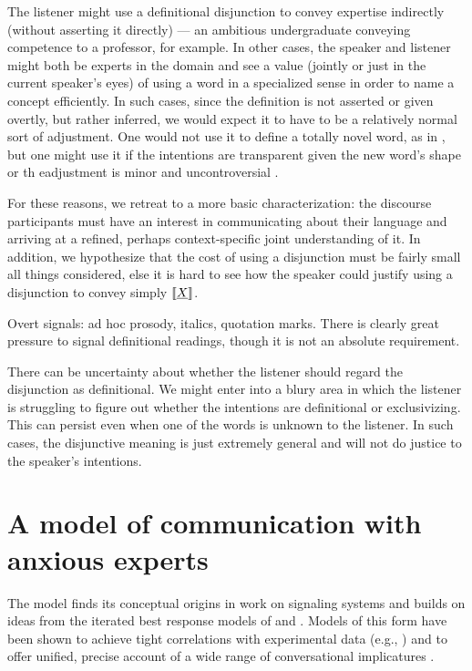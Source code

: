 \documentclass{article}
\begin{document}
The listener might use a definitional disjunction to convey expertise
indirectly (without asserting it directly) --- an ambitious
undergraduate conveying competence to a professor, for example. In
other cases, the speaker and listener might both be experts in the
domain and see a value (jointly or just in the current speaker's eyes)
of using a word in a specialized sense in order to name a concept
efficiently. In such cases, since the definition is not asserted or
given overtly, but rather inferred, we would expect it to have to be a
relatively normal sort of adjustment. One would not use it to define a
totally novel word, as in , but one might use it
if the intentions are transparent given the new word's shape  or th eadjustment is minor and
uncontroversial .

For these reasons, we retreat to a more basic characterization: the
discourse participants must have an interest in communicating about
their language and arriving at a refined, perhaps context-specific
joint understanding of it. In addition, we hypothesize that the cost
of using a disjunction must be fairly small all things considered,
else it is hard to see how the speaker could justify using a
disjunction  to convey simply $\llbracket\emph{X}\rrbracket$.


Overt signals: ad hoc prosody, italics, quotation marks. There is
clearly great pressure to signal definitional readings, though it is
not an absolute requirement.


There can be uncertainty about whether the listener should regard the
disjunction as definitional. We might enter into a blury area in which
the listener is struggling to figure out whether the intentions are
definitional or exclusivizing. This can persist even when one of the
words is unknown to the listener. In such cases, the disjunctive
meaning is just extremely general and will not do justice to the
speaker's intentions.



\section{A model of communication with anxious experts}\label{sec:model}

The model finds its conceptual origins in  work on
signaling systems and builds on ideas from the iterated best response
models of \citet{Jaeger:2007,Jaeger:2011} and
\citet{Franke09DISS}. Models of this form have been shown to achieve
tight correlations with experimental data (e.g.,
\citealt{Frank:Goodman:2012}) and to offer unified, precise account of
a wide range of conversational implicatures
\citep{bergen-levy-goodman:2014}.
\end{document}
